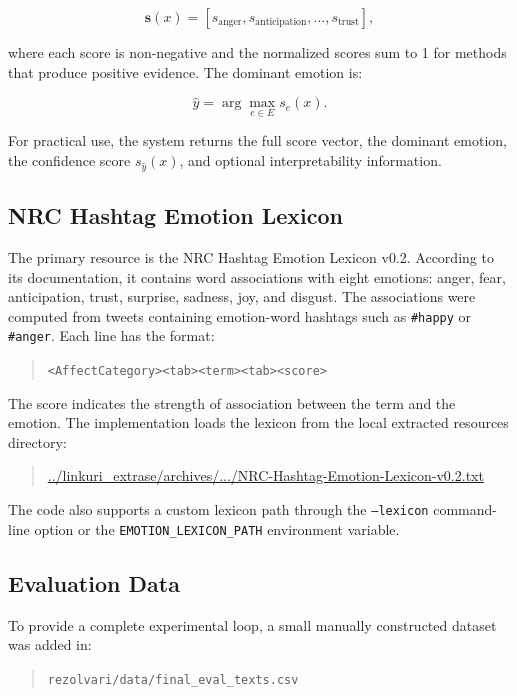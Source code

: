 \documentclass[11pt]{article}
\begin{document}
\[
\mathbf{s}(x) = [s_{\text{anger}}, s_{\text{anticipation}}, \ldots, s_{\text{trust}}],
\]

where each score is non-negative and the normalized scores sum to 1 for methods that produce positive evidence. The dominant emotion is:

\[
\hat{y} = \arg\max_{e \in E} s_e(x).
\]

For practical use, the system returns the full score vector, the dominant emotion, the confidence score $s_{\hat{y}}(x)$, and optional interpretability information.

\subsection{NRC Hashtag Emotion Lexicon}

The primary resource is the NRC Hashtag Emotion Lexicon v0.2. According to its documentation, it contains word associations with eight emotions: anger, fear, anticipation, trust, surprise, sadness, joy, and disgust. The associations were computed from tweets containing emotion-word hashtags such as \texttt{\#happy} or \texttt{\#anger}. Each line has the format:

\begin{quote}
\texttt{<AffectCategory><tab><term><tab><score>}
\end{quote}

The score indicates the strength of association between the term and the emotion. The implementation loads the lexicon from the local extracted resources directory:

\begin{quote}
\small
\url{../linkuri_extrase/archives/.../NRC-Hashtag-Emotion-Lexicon-v0.2.txt}
\end{quote}

The code also supports a custom lexicon path through the \texttt{--lexicon} command-line option or the \texttt{EMOTION\_LEXICON\_PATH} environment variable.

\subsection{Evaluation Data}

To provide a complete experimental loop, a small manually constructed dataset was added in:

\begin{quote}
\texttt{rezolvari/data/final\_eval\_texts.csv}
\end{quote}
\end{document}
